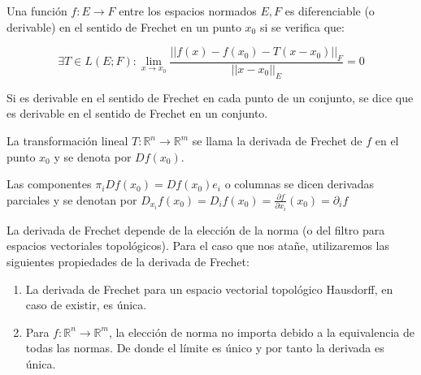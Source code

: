 \begin{defn}
	Una función $f:E \to F$ entre los espacios normados $E,F$ es diferenciable (o derivable) en el sentido de Frechet en un punto $x_0$ si se verifica que:
	
	\begin{equation*}
		\exists T \in L(E ; F): \lim_{x \to x_0}\frac{||f(x)-f(x_0) - T(x-x_0)||_F}{||x-x_0||_E} = 0
	\end{equation*}
	
	
	Si es derivable en el sentido de Frechet en cada punto de un conjunto, se dice que es derivable en el sentido de Frechet en un conjunto.
	
	La transformación lineal $T:\mathbb{R}^n \to \mathbb{R}^m$ se llama la derivada de Frechet de $f$ en el punto $x_0$ y se denota por $Df(x_0)$.
	
	Las componentes $\pi_i Df(x_0) =Df(x_0) e_i$ o columnas se dicen derivadas parciales y se denotan por $D_{x_i}f(x_0) = D_i f(x_0) =  \frac{\partial f}{\partial x_i}(x_0) = \partial_i f$
\end{defn}

\begin{rmrk}
	La derivada de Frechet depende de la elección de la norma (o del filtro para espacios vectoriales topológicos). Para el caso que nos atañe, utilizaremos las siguientes propiedades de la derivada de Frechet:
	
	\begin{enumerate}
		\item La derivada de Frechet para un espacio vectorial topológico Hausdorff, en caso de existir, es única.
		
		\item Para $f:\mathbb{R}^n\to \mathbb{R}^m$, la elección de norma no importa debido a la equivalencia de todas las normas. De donde el límite es único y por tanto la derivada es única.
	\end{enumerate}
\end{rmrk}


